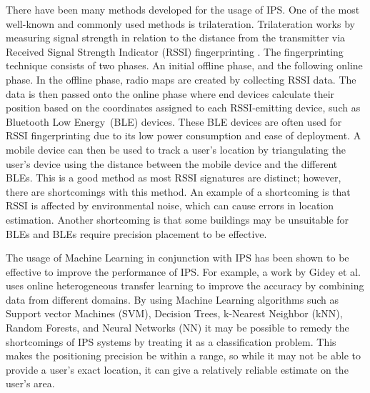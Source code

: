 \documentclass[runningheads]{llncs}
\begin{document}
There have been many methods developed for the usage of IPS. One of the most well-known and commonly used methods is trilateration. Trilateration works by measuring signal strength in relation to the distance from the transmitter via Received Signal Strength Indicator (RSSI) fingerprinting \cite{bg2}. The fingerprinting technique consists of two phases. An initial offline phase, and the following online phase. In the offline phase, radio maps are created by collecting RSSI data. The data is then passed onto the online phase where end devices calculate their position based on the coordinates assigned to each RSSI-emitting device, such as Bluetooth Low Energy~(BLE) devices. These BLE devices are often used for RSSI fingerprinting due to its low power consumption and ease of deployment. A mobile device can then be used to track a user's location by triangulating the user's device using the distance between the mobile device and the different BLEs. This is a good method as most RSSI signatures are distinct; however, there are shortcomings with this method. An example of a shortcoming is that RSSI is affected by environmental noise, which can cause errors in location estimation\cite{bgp2}. Another shortcoming is that some buildings may be unsuitable for BLEs and BLEs require precision placement to be effective.

The usage of Machine Learning in conjunction with IPS has been shown to be effective to improve the performance of IPS. For example, a work by Gidey et al. \cite{bgp3} uses online heterogeneous transfer learning to improve the accuracy by combining data from different domains. By using Machine Learning algorithms such as Support vector Machines (SVM), Decision Trees, k-Nearest Neighbor (kNN), Random Forests, and Neural Networks (NN) it may be possible to remedy the shortcomings of IPS systems by treating it as a classification problem. This makes the positioning precision be within a range, so while it may not be able to provide a user's exact location, it can give a relatively reliable estimate on the user's area.
\end{document}
